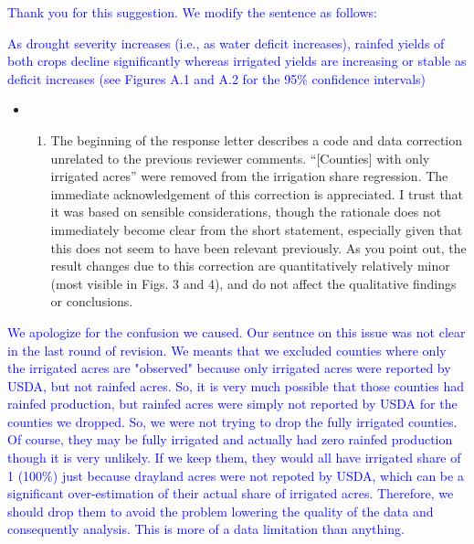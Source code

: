\documentclass[
]{article}
\providecommand{\tightlist}{%
  \setlength{\itemsep}{0pt}\setlength{\parskip}{0pt}}
\begin{document}
\textcolor{blue}{Thank you for this suggestion. We modify the sentence as follows:}

\textcolor{blue}{As drought severity increases (i.e., as water deficit increases), rainfed yields of both crops decline significantly whereas irrigated yields are increasing or stable as deficit increases (see Figures A.1 and A.2 for the 95\% confidence intervals)}

\begin{itemize}
\item
  \begin{enumerate}
  \def\labelenumi{(\arabic{enumi})}
  \setcounter{enumi}{1}
  \tightlist
  \item
    The beginning of the response letter describes a code and data
    correction unrelated to the previous reviewer comments.
    ``{[}Counties{]} with only irrigated acres'' were removed from the
    irrigation share regression. The immediate acknowledgement of this
    correction is appreciated. I trust that it was based on sensible
    considerations, though the rationale does not immediately become
    clear from the short statement, especially given that this does not
    seem to have been relevant previously. As you point out, the result
    changes due to this correction are quantitatively relatively minor
    (most visible in Figs. 3 and 4), and do not affect the qualitative
    findings or conclusions.
  \end{enumerate}
\end{itemize}

\textcolor{blue}{We apologize for the confusion we caused. Our sentnce on this issue was not clear in the last round of revision. We meants that we excluded counties where only the irrigated acres are "observed" because only irrigated acres were reported by USDA, but not rainfed acres. So, it is very much possible that those counties had rainfed production, but rainfed acres were simply not reported by USDA for the counties we dropped. So, we were not trying to drop the fully irrigated counties. Of course, they may be fully irrigated and actually had zero rainfed production though it is very unlikely. If we keep them, they would all have irrigated share of 1 (100\%) just because drayland acres were not repoted by USDA, which can be a significant over-estimation of their actual share of irrigated acres. Therefore, we should drop them to avoid the problem lowering the quality of the data and consequently analysis. This is more of a data limitation than anything.}
\end{document}
